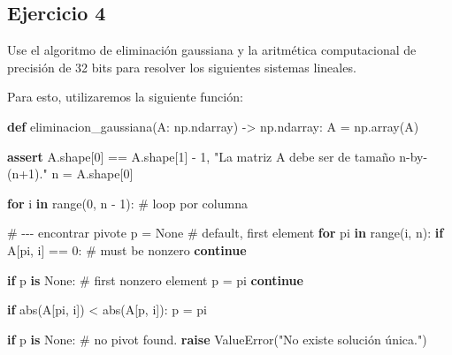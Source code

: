 \documentclass[
  letterpaper,
  DIV=11,
  numbers=noendperiod]{scrartcl}
\newenvironment{Shaded}{\begin{snugshade}}{\end{snugshade}}
\newcommand{\BuiltInTok}[1]{\textcolor[rgb]{0.00,0.23,0.31}{#1}}
\newcommand{\CommentTok}[1]{\textcolor[rgb]{0.37,0.37,0.37}{#1}}
\newcommand{\ControlFlowTok}[1]{\textcolor[rgb]{0.00,0.23,0.31}{\textbf{#1}}}
\newcommand{\DecValTok}[1]{\textcolor[rgb]{0.68,0.00,0.00}{#1}}
\newcommand{\KeywordTok}[1]{\textcolor[rgb]{0.00,0.23,0.31}{\textbf{#1}}}
\newcommand{\NormalTok}[1]{\textcolor[rgb]{0.00,0.23,0.31}{#1}}
\newcommand{\OperatorTok}[1]{\textcolor[rgb]{0.37,0.37,0.37}{#1}}
\newcommand{\PreprocessorTok}[1]{\textcolor[rgb]{0.68,0.00,0.00}{#1}}
\newcommand{\StringTok}[1]{\textcolor[rgb]{0.13,0.47,0.30}{#1}}
\newcommand{\VariableTok}[1]{\textcolor[rgb]{0.07,0.07,0.07}{#1}}
\begin{document}
\subsection{Ejercicio 4}\label{ejercicio-4}

Use el algoritmo de eliminación gaussiana y la aritmética computacional
de precisión de 32 bits para resolver los siguientes sistemas lineales.

Para esto, utilizaremos la siguiente función:

\begin{Shaded}
\begin{Highlighting}[]
\KeywordTok{def}\NormalTok{ eliminacion\_gaussiana(A: np.ndarray) }\OperatorTok{{-}\textgreater{}}\NormalTok{ np.ndarray:}
\NormalTok{    A }\OperatorTok{=}\NormalTok{ np.array(A)}
    
    \ControlFlowTok{assert}\NormalTok{ A.shape[}\DecValTok{0}\NormalTok{] }\OperatorTok{==}\NormalTok{ A.shape[}\DecValTok{1}\NormalTok{] }\OperatorTok{{-}} \DecValTok{1}\NormalTok{, }\StringTok{"La matriz A debe ser de tamaño n{-}by{-}(n+1)."}
\NormalTok{    n }\OperatorTok{=}\NormalTok{ A.shape[}\DecValTok{0}\NormalTok{]}

    \ControlFlowTok{for}\NormalTok{ i }\KeywordTok{in} \BuiltInTok{range}\NormalTok{(}\DecValTok{0}\NormalTok{, n }\OperatorTok{{-}} \DecValTok{1}\NormalTok{):  }\CommentTok{\# loop por columna}

        \CommentTok{\# {-}{-}{-} encontrar pivote}
\NormalTok{        p }\OperatorTok{=} \VariableTok{None}  \CommentTok{\# default, first element}
        \ControlFlowTok{for}\NormalTok{ pi }\KeywordTok{in} \BuiltInTok{range}\NormalTok{(i, n):}
            \ControlFlowTok{if}\NormalTok{ A[pi, i] }\OperatorTok{==} \DecValTok{0}\NormalTok{:}
                \CommentTok{\# must be nonzero}
                \ControlFlowTok{continue}

            \ControlFlowTok{if}\NormalTok{ p }\KeywordTok{is} \VariableTok{None}\NormalTok{:}
                \CommentTok{\# first nonzero element}
\NormalTok{                p }\OperatorTok{=}\NormalTok{ pi}
                \ControlFlowTok{continue}

            \ControlFlowTok{if} \BuiltInTok{abs}\NormalTok{(A[pi, i]) }\OperatorTok{\textless{}} \BuiltInTok{abs}\NormalTok{(A[p, i]):}
\NormalTok{                p }\OperatorTok{=}\NormalTok{ pi}

        \ControlFlowTok{if}\NormalTok{ p }\KeywordTok{is} \VariableTok{None}\NormalTok{:}
            \CommentTok{\# no pivot found.}
            \ControlFlowTok{raise} \PreprocessorTok{ValueError}\NormalTok{(}\StringTok{"No existe solución única."}\NormalTok{)}


\end{Highlighting}
\end{Shaded}
\end{document}
